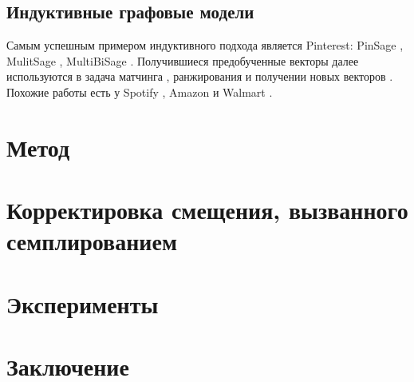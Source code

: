 \documentclass{article}
\begin{document}
\subsection{Индуктивные графовые модели}

Самым успешным примером индуктивного подхода является Pinterest: PinSage \cite{pinsage}, MulitSage \cite{multisage}, MultiBiSage \cite{multibisage}. Получившиеся 
предобученные векторы далее используются в задача матчинга \cite{pinnerformer}, ранжирования \cite{transact} и получении новых векторов \cite{itemsage}.
Похожие работы есть у Spotify \cite{podcastgnn}, Amazon \cite{amazonalexa} и Walmart \cite{walmart}.

\section{Метод}



\section{Корректировка смещения, вызванного семплированием}

\section{Эксперименты}

\section{Заключение}


 
\end{document}
